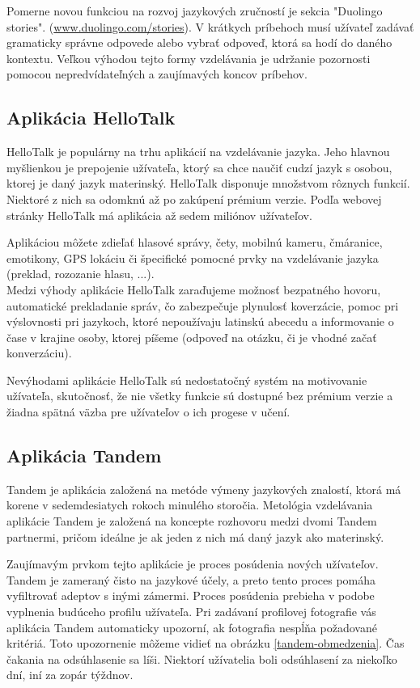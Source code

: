 \documentclass[10pt,oneside,slovak,a4paper]{article}
\begin{document}
Pomerne novou funkciou na rozvoj jazykových zručností je sekcia "Duolingo stories". (\href{https://www.duolingo.com/stories/}{www.duolingo.com/stories}). V krátkych príbehoch musí užívateľ zadávať gramaticky správne odpovede alebo vybrať odpoveď, ktorá sa hodí do daného kontextu. Veľkou výhodou tejto formy vzdelávania je udržanie pozornosti pomocou nepredvídateľných a zaujímavých koncov príbehov. 

\subsection{Aplikácia HelloTalk} %
HelloTalk je populárny na trhu aplikácií na vzdelávanie jazyka. Jeho hlavnou myšlienkou je prepojenie užívateľa, ktorý sa chce naučiť cudzí jazyk s osobou, ktorej je daný jazyk materinský. HelloTalk disponuje množstvom rôznych funkcií. Niektoré z nich sa odomknú až po zakúpení prémium verzie. Podľa webovej stránky HelloTalk má aplikácia až sedem miliónov užívateľov.\cite{hellotalk}

Aplikáciou môžete zdieľať hlasové správy, čety, mobilnú kameru, čmáranice, emotikony, GPS lokáciu či špecifické pomocné prvky na vzdelávanie jazyka (preklad, rozozanie hlasu, ...).\cite{hellotalk}\\

 Medzi výhody aplikácie HelloTalk zaraďujeme 
 možnosť bezpatného hovoru,
 automatické prekladanie správ, čo zabezpečuje plynulosť koverzácie,
 pomoc pri výslovnosti pri jazykoch, ktoré nepoužívaju latinskú abecedu a
 informovanie o čase v krajine osoby, ktorej píšeme (odpoveď na otázku, či je vhodné začať konverzáciu). \cite{hellotalk}

Nevýhodami aplikácie HelloTalk sú
 nedostatočný systém na motivovanie užívateľa, skutočnosť, že
 nie všetky funkcie sú dostupné bez prémium verzie a
 žiadna spätná väzba pre užívateľov o ich progese v učení. \cite{hellotalk}
\subsection{Aplikácia Tandem} %
Tandem je aplikácia založená na metóde výmeny jazykových znalostí, ktorá má korene v sedemdesiatych rokoch minulého storočia. Metológia vzdelávania aplikácie Tandem je založená na koncepte rozhovoru medzi dvomi Tandem partnermi, pričom ideálne je ak jeden z nich má daný jazyk ako materinský.

Zaujímavým prvkom tejto aplikácie je proces posúdenia nových užívateľov.\cite{tandem} Tandem je zameraný čisto na jazykové účely, a preto tento proces pomáha vyfiltrovať adeptov s inými zámermi. Proces posúdenia prebieha v podobe vyplnenia budúceho profilu užívateľa. Pri zadávaní profilovej fotografie vás aplikácia Tandem automaticky upozorní, ak fotografia nespĺňa požadované kritériá. Toto upozornenie môžeme vidieť na obrázku \ref{tandem-obmedzenia}. Čas čakania na odsúhlasenie sa líši. Niektorí užívatelia boli odsúhlasení za niekoľko dní, iní za zopár týždnov.
\end{document}
